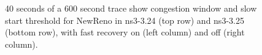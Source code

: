 \documentclass[conference]{IEEEtran}
\begin{document}
\begin{figure}[h!]
\begin{center}
\end{center}
\caption{40 seconds of a 600 second trace show congestion window and slow start threshold for NewReno in ns3-3.24 (top row) and ns3-3.25 (bottom row), with fast recovery on (left column) and off (right column).}
\label{fig:NS3Val}
\end{figure}
\end{document}
